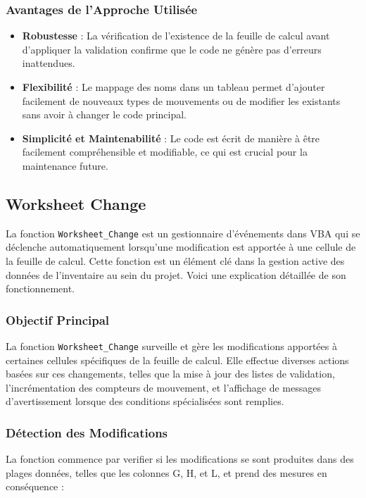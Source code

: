 \documentclass[a4paper, oneside, 12pt, final]{extreport}
\begin{document}
\subsubsection{Avantages de l'Approche Utilisée}
\begin{itemize}
    \item \textbf{Robustesse} : La vérification de l'existence de la feuille de calcul avant d'appliquer la validation confirme que le code ne génère pas d'erreurs inattendues.
    \item \textbf{Flexibilité} : Le mappage des noms dans un tableau permet d'ajouter facilement de nouveaux types de mouvements ou de modifier les existants sans avoir à changer le code principal.
    \item \textbf{Simplicité et Maintenabilité} : Le code est écrit de manière à être facilement compréhensible et modifiable, ce qui est crucial pour la maintenance future.
\end{itemize}


\subsection{Worksheet Change}
La fonction \texttt{Worksheet\_Change} est un gestionnaire d'événements dans VBA qui se déclenche automatiquement lorsqu'une modification est apportée à une cellule de la feuille de calcul. Cette fonction est un élément clé dans la gestion active des données de l'inventaire au sein du projet. Voici une explication détaillée de son fonctionnement.

\subsubsection{Objectif Principal}
La fonction \texttt{Worksheet\_Change} surveille et gère les modifications apportées à certaines cellules spécifiques de la feuille de calcul. Elle effectue diverses actions basées sur ces changements, telles que la mise à jour des listes de validation, l'incrémentation des compteurs de mouvement, et l'affichage de messages d'avertissement lorsque des conditions spécialisées sont remplies.

\subsubsection{Détection des Modifications}
La fonction commence par verifier si les modifications se sont produites dans des plages données, telles que les colonnes G, H, et L, et prend des mesures en conséquence :
\end{document}
